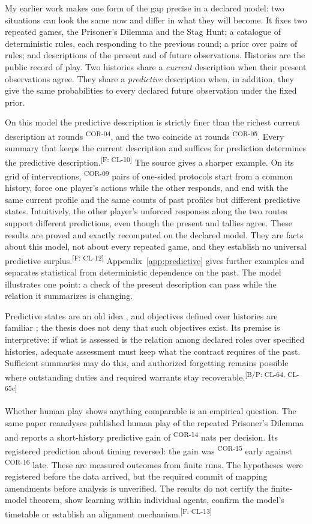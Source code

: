 \documentclass[pdflatex,sn-basic]{sn-jnl}%
\newcommand{\claim}[2]{\ifannotated\textsuperscript{\textcolor{blue!60!black}{\tiny[#1: #2]}}\fi}
\newcommand{\rec}[1]{\ifannotated\textsuperscript{\textcolor{blue!60!black}{\tiny#1}}\fi}
\newcommand{\Selfcite}[1]{\ifanonymous\citet{#1}\else My earlier work \citep{#1}\fi}
\begin{document}
\Selfcite{tsiokos2026institutions} makes one form of the gap precise in a declared model: two situations can look the same now and differ in what they will become. It fixes two repeated games, the Prisoner's Dilemma and the Stag Hunt; a catalogue of deterministic rules, each responding to the previous round; a prior over pairs of rules; and descriptions of the present and of future observations. Histories are the public record of play. Two histories share a \emph{current} description when their present observations agree. They share a \emph{predictive} description when, in addition, they give the same probabilities to every declared future observation under the fixed prior.

On this model the predictive description is strictly finer than the richest current description at rounds \numInstStrictRounds\rec{COR-04}, and the two coincide at rounds \numInstCoincideRounds\rec{COR-05}. Every summary that keeps the current description and suffices for prediction determines the predictive description.\claim{F}{CL-10} The source gives a sharper example. On its grid of interventions, \numInstLoopPairs\rec{COR-09} pairs of one-sided protocols start from a common history, force one player's actions while the other responds, and end with the same current profile and the same counts of past profiles but different predictive states. Intuitively, the other player's unforced responses along the two routes support different predictions, even though the present and tallies agree. These results are proved and exactly recomputed on the declared model. They are facts about this model, not about every repeated game, and they establish no universal predictive surplus.\claim{F}{CL-12} Appendix~\ref{app:predictive} gives further examples and separates statistical from deterministic dependence on the past. The model illustrates one point: a check of the present description can pass while the relation it summarizes is changing.

Predictive states are an old idea \citep{shalizi2001}, and objectives defined over histories are familiar \citep{bacchus1996,toroicarte2018}; the thesis does not deny that such objectives exist. Its premise is interpretive: if what is assessed is the relation among declared roles over specified histories, adequate assessment must keep what the contract requires of the past. Sufficient summaries may do this, and authorized forgetting remains possible where outstanding duties and required warrants stay recoverable.\claim{B/P}{CL-64, CL-65c}

Whether human play shows anything comparable is an empirical question. The same paper reanalyses published human play of the repeated Prisoner's Dilemma and reports a short-history predictive gain of \numInstHumanGain\rec{COR-14} nats per decision. Its registered prediction about timing reversed: the gain was \numInstEarlyGain\rec{COR-15} early against \numInstLateGain\rec{COR-16} late. These are measured outcomes from finite runs. The hypotheses were registered before the data arrived, but the required commit of mapping amendments before analysis is unverified. The results do not certify the finite-model theorem, show learning within individual agents, confirm the model's timetable or establish an alignment mechanism.\claim{F}{CL-13}
\end{document}
